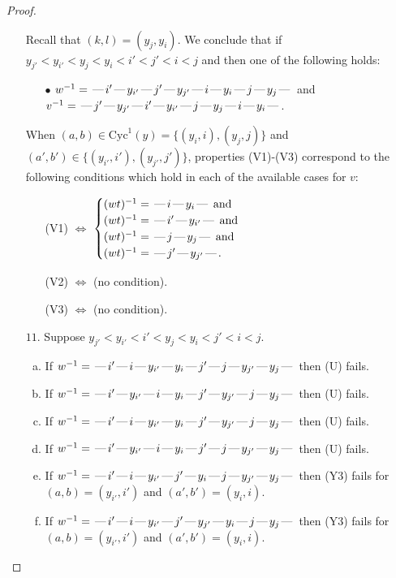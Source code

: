 \documentclass[10pt]{article}
\theoremstyle{definition}
\theoremstyle{definition}
\def\dash{\text{\hspace{0.5mm}---\hspace{0.5mm}}}
\def\Cyc{\mathrm{Cyc}}
\begin{document}
\begin{proof}
\begin{enumerate}
\begin{enumerate}[(a)]
\end{enumerate}
Recall that $(k,l) = (y_j,y_i)$.
We conclude that if $y_{j'} < y_{i'} < y_j < y_i < i' < j' < i < j$ and then one of the following holds:
\begin{enumerate}
\item[$\bullet$] $w^{-1} = \dash i'\dash y_{i'}\dash j'\dash y_{j'}\dash i\dash y_i\dash j\dash y_j\dash $ and $v^{-1} = \dash j'\dash y_{j'}\dash i'\dash y_{i'}\dash j\dash y_j\dash i\dash y_i\dash $.
\end{enumerate}
When $(a,b)\in\Cyc^1(y)=\{(y_i,i),(y_j,j)\}$ and $(a',b')\in\{(y_{i'},i'),(y_{j'},j')\}$,
properties (V1)-(V3) correspond to the following conditions which hold in
each of the available cases for $v$:
\begin{enumerate}
\item[](V1) $\Leftrightarrow$ $\begin{cases}\text{$(wt)^{-1} = \dash i \dash y_i \dash$}\text{ and }\\
\text{$(wt)^{-1} = \dash i' \dash y_{i'} \dash$}\text{ and }\\
\text{$(wt)^{-1} = \dash j \dash y_j \dash$}\text{ and }\\
\text{$(wt)^{-1} = \dash j' \dash y_{j'} \dash$}.\end{cases}$
\item[](V2) $\Leftrightarrow$ (no condition).
\item[](V3) $\Leftrightarrow$ (no condition).
\end{enumerate}
\item[$11$.] Suppose $y_{j'} < y_{i'} < i' < y_j < y_i < j' < i < j$.
\begin{enumerate}[(a)]
\item If $w^{-1} = \dash i'\dash i\dash y_{i'}\dash y_i\dash j'\dash j\dash y_{j'}\dash y_j\dash $ then (U) fails.
\item If $w^{-1} = \dash i'\dash y_{i'}\dash i\dash y_i\dash j'\dash y_{j'}\dash j\dash y_j\dash $ then (U) fails.
\item If $w^{-1} = \dash i'\dash i\dash y_{i'}\dash y_i\dash j'\dash y_{j'}\dash j\dash y_j\dash $ then (U) fails.
\item If $w^{-1} = \dash i'\dash y_{i'}\dash i\dash y_i\dash j'\dash j\dash y_{j'}\dash y_j\dash $ then (U) fails.
\item If $w^{-1} = \dash i'\dash i\dash y_{i'}\dash j'\dash y_i\dash j\dash y_{j'}\dash y_j\dash $ then (Y3) fails for $(a,b)=(y_{i'},i')$ and $(a',b')=(y_i,i)$.
\item If $w^{-1} = \dash i'\dash i\dash y_{i'}\dash j'\dash y_{j'}\dash y_i\dash j\dash y_j\dash $ then (Y3) fails for $(a,b)=(y_{i'},i')$ and $(a',b')=(y_i,i)$.

\end{enumerate}
\end{enumerate}
\end{proof}
\end{document}
